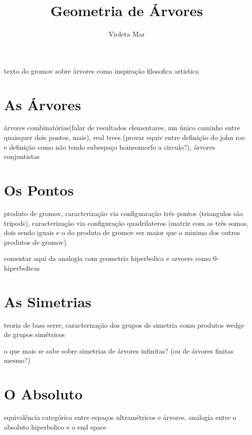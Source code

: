 \documentclass[11pt]{article}
\title{Geometria de Árvores}
\author{Violeta Mar}
\date{}
\theoremstyle{definition}
\theoremstyle{definition}
\theoremstyle{definition}
\theoremstyle{definition}
\theoremstyle{definition}
\theoremstyle{definition}
\theoremstyle{definition}
\theoremstyle{definition}
\theoremstyle{definition}
\theoremstyle{definition}
\theoremstyle{definition}
\theoremstyle{definition}
\theoremstyle{definition}
\begin{document}
\maketitle

texto do gromov sobre árvores como inspiração filosofica artistica

\section{As Árvores}
árvores combinatórias(falar de resultados elementares, um único caminho entre quaisquer dois pontos, mais), real trees (provar equiv entre definição do john roe e definição como não tendo subespaço homeomorfo a circulo?), árvores conjuntistas

\section{Os Pontos}
produto de gromov, caracterização via configuaração três pontos (triangulos são tripods), caracterização via configuração quadrilateros (matriz com as três somas, dois sendo iguais e o do produto de gromov ser maior que o minimo dos outros produtos de gromov)

comentar aqui da analogia com geometria hiperbolica e arvoers como 0-hiperbolicas

\section{As Simetrias}
teoria de bass serre, caracterização dos grupos de simetria como produtos wedge de grupos simétricos

o que mais se sabe sobre simetrias de árvores infinitas? (ou de árvores finitas mesmo?)

\section{O Absoluto}
equivalência categórica entre espaços ultramétricos e árvores, analogia entre o absoluto hiperbolico e o end space
\end{document}
